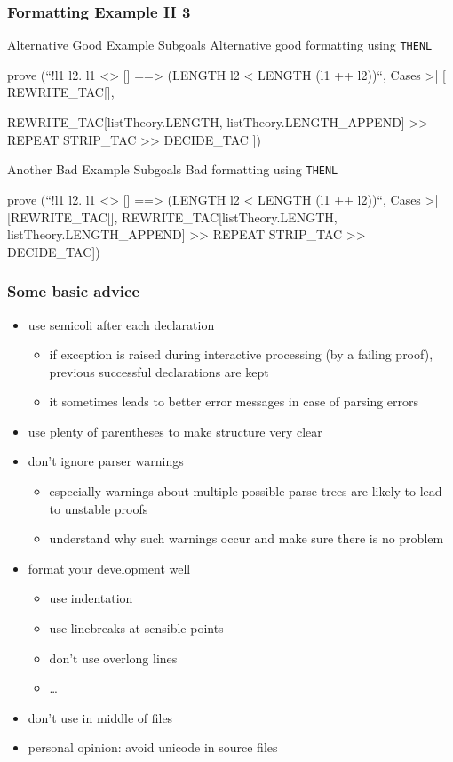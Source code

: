 \begin{frame}[fragile]
\frametitle{Formatting Example II 3}

\begin{exampleblock}{Alternative Good Example Subgoals}
Alternative good formatting using \texttt{THENL}
\begin{semiverbatim}\scriptsize
prove (``!l1 l2. l1 <> [] ==> (LENGTH l2 < LENGTH (l1 ++ l2))``,
Cases >| [
  REWRITE_TAC[],

  REWRITE_TAC[listTheory.LENGTH, listTheory.LENGTH_APPEND] >>
  REPEAT STRIP_TAC >>
  DECIDE_TAC
])
\end{semiverbatim}
\end{exampleblock}

\begin{alertblock}{Another Bad Example Subgoals}
Bad formatting using \texttt{THENL}
\begin{semiverbatim}\scriptsize
prove (``!l1 l2. l1 <> [] ==> (LENGTH l2 < LENGTH (l1 ++ l2))``,
Cases >| [REWRITE_TAC[],
REWRITE_TAC[listTheory.LENGTH, listTheory.LENGTH_APPEND] >>
REPEAT STRIP_TAC >> DECIDE_TAC])
\end{semiverbatim}
\end{alertblock}
\end{frame}


\begin{frame}
\frametitle{Some basic advice}
\begin{itemize}
\item use semicoli after each declaration
\begin{itemize}
\item if exception is raised during interactive processing (\eg by a failing proof), previous successful declarations are kept
\item it sometimes leads to better error messages in case of parsing errors
\end{itemize}
\item use plenty of parentheses to make structure very clear
\item don't ignore parser warnings
\begin{itemize}
\item especially warnings about multiple possible parse trees are likely to lead to unstable proofs
\item understand why such warnings occur and make sure there is no problem
\end{itemize}
\item format your development well
\begin{itemize}
\item use indentation
\item use linebreaks at sensible points
\item don't use overlong lines 
\item \ldots
\end{itemize}
\item don't use  in middle of files
\item personal opinion: avoid unicode in source files
\end{itemize}
\end{frame}

